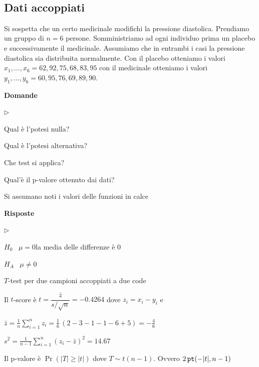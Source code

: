 \documentclass[11pt,openany]{book}
\newcommand{\mylabel}[1]{{\footnotesize\textsf{#1}}\hfill}
\renewenvironment{itemize}
  {\begin{list}{$\triangleright$}{%
   \setlength{\parskip}{0mm}
   \setlength{\topsep}{.2\baselineskip}
   \setlength{\rightmargin}{0mm}
   \setlength{\listparindent}{0mm}
   \setlength{\itemindent}{0mm}
   \setlength{\labelwidth}{3ex}
   \setlength{\itemsep}{.4\baselineskip}
   \setlength{\parsep}{0mm}
   \setlength{\partopsep}{0mm}
   \setlength{\labelsep}{1ex}
   \setlength{\leftmargin}{\labelwidth+\labelsep}
   \let\makelabel\mylabel}}{%
   \end{list}\vspace*{-1.3mm}}
\begin{document}
\clearpage\
\subsection{Dati accoppiati}

Si sospetta che un certo medicinale modifichi la pressione diastolica.  Prendiamo un gruppo di $n=6$ persone. Somministriamo ad ogni individuo prima un placebo e successivamente il medicinale. Assumiamo che in entrambi i casi la pressione diastolica sia distribuita normalmente. Con il placebo otteniamo i valori $x_1,\dots,x_6=62,92,75,68,83,95$ con il medicinale otteniamo i valori $y_1,\dots,y_6=60,95,76,69,89,90$.


\textbf{Domande}

\begin{itemize}
  \item[1.] Qual è l'potesi nulla?
  
  \item[2.] Qual è l'potesi alternativa?
  
  \item[3.] Che test si applica?
  
  \item[4.] Qual'è il p-valore ottenuto dai dati?
  \end{itemize}
  
  Si assumano noti i valori delle funzioni in calce
  
  \textbf{Risposte}

\begin{itemize}
\item[1.] $H_0$ \ $\mu = 0$\hfill la media delle differenze è $0$

\item[2.] $H_A$ \ $\mu\neq0$

\item[3.] $T$-test per due campioni accoppiati a due code

\item[4.] Il $t$-score è 
$t = \dfrac{\bar z}{s/\sqrt{n}}= -0.4264$ dove $z_i=x_i-y_i$ e

$\displaystyle\bar z = \frac1{n}\sum^n_{i=1}z_i=\frac16\,(2-3-1-1-6+5)=-\frac46$

$\displaystyle s^2= \frac1{n-1}\sum^n_{i=1}(z_i-\bar z)^2=14.67$

\item[4.] Il p-valore è $\Pr(|T|\ge |t|)$ dove $T\sim t(n-1)$.
Ovvero $2\,{\tt pt}(-|t|, n-1)$
\end{itemize}
\end{document}
